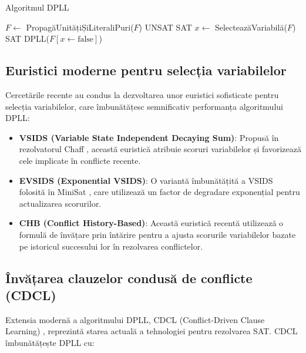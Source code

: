 \documentclass[a4paper,10pt]{article}
\begin{document}
\begin{algorithm}
\caption{Algoritmul DPLL}
\begin{algorithmic}[1]
    \State $F \gets$ PropagăUnitățiȘiLiteraliPuri($F$)
        \Return UNSAT
    \EndIf
        \Return SAT
    \EndIf
    \State $x \gets$ SelecteazăVariabilă($F$)
        \Return SAT
    \Else
        \Return DPLL($F[x \gets \text{false}]$)
    \EndIf
\EndFunction
\end{algorithmic}
\end{algorithm}

\subsection{Euristici moderne pentru selecția variabilelor}

Cercetările recente \cite{Marques-Silva2021, Audemard2018} au condus la dezvoltarea unor euristici sofisticate pentru selecția variabilelor, care îmbunătățesc semnificativ performanța algoritmului DPLL:

\begin{itemize}
    \item \textbf{VSIDS (Variable State Independent Decaying Sum)}: Propusă în rezolvatorul Chaff \cite{Moskewicz2001}, această euristică atribuie scoruri variabilelor și favorizează cele implicate în conflicte recente. 
    
    \item \textbf{EVSIDS (Exponential VSIDS)}: O variantă îmbunătățită a VSIDS folosită în MiniSat \cite{Een2003}, care utilizează un factor de degradare exponențial pentru actualizarea scorurilor.
    
    \item \textbf{CHB (Conflict History-Based)}: Această euristică recentă utilizează o formulă de învățare prin întărire pentru a ajusta scorurile variabilelor bazate pe istoricul succesului lor în rezolvarea conflictelor.
\end{itemize}

\subsection{Învățarea clauzelor condusă de conflicte (CDCL)}

Extensia modernă a algoritmului DPLL, CDCL (Conflict-Driven Clause Learning) \cite{Marques-Silva2021}, reprezintă starea actuală a tehnologiei pentru rezolvarea SAT. CDCL îmbunătățește DPLL cu:
\end{document}
